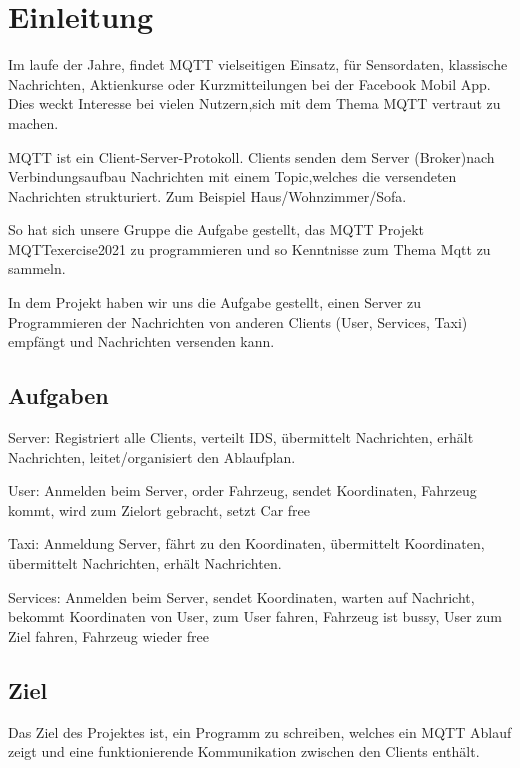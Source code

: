 \section{Einleitung}


Im laufe der Jahre, findet MQTT vielseitigen Einsatz, für Sensordaten, klassische Nachrichten, Aktienkurse oder Kurzmitteilungen bei der Facebook Mobil App.
Dies weckt Interesse bei vielen Nutzern,sich mit dem Thema MQTT vertraut zu machen.

MQTT ist ein Client-Server-Protokoll.
Clients senden dem Server (Broker)nach Verbindungsaufbau Nachrichten mit einem Topic,welches die versendeten Nachrichten strukturiert. 
Zum Beispiel Haus/Wohnzimmer/Sofa.

So hat sich unsere Gruppe die Aufgabe gestellt, das MQTT Projekt MQTTexercise2021 zu programmieren und so Kenntnisse zum Thema Mqtt zu sammeln.

In dem Projekt haben wir uns die Aufgabe gestellt, einen Server zu Programmieren der Nachrichten von anderen Clients (User, Services, Taxi) empfängt und Nachrichten versenden kann.

\subsection{Aufgaben}

Server: Registriert alle Clients, verteilt IDS, übermittelt Nachrichten, 
erhält Nachrichten, leitet/organisiert den Ablaufplan.

User: Anmelden beim Server, order Fahrzeug, sendet Koordinaten, Fahrzeug kommt, wird zum Zielort gebracht, setzt Car free

Taxi: Anmeldung Server, fährt zu den Koordinaten, übermittelt Koordinaten, übermittelt Nachrichten, erhält Nachrichten.

Services: Anmelden beim Server, sendet Koordinaten, warten auf Nachricht, bekommt Koordinaten von User, zum User fahren, Fahrzeug ist  bussy, User zum Ziel fahren, Fahrzeug wieder free

\subsection{Ziel}

Das Ziel des Projektes ist, ein Programm zu schreiben, welches ein MQTT Ablauf zeigt und eine funktionierende Kommunikation zwischen den Clients enthält.

